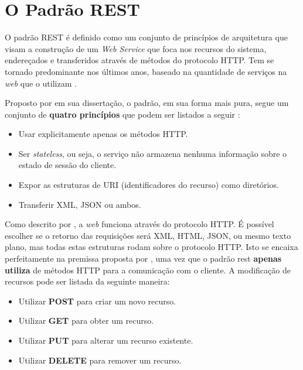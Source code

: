 \documentclass[12pt, openright, oneside, a4paper, brazil]{abntex2}
\begin{document}
\section{O Padrão REST}

O padrão REST é definido como um conjunto de princípios de arquitetura que visam a construção de um \textit{Web Service} que foca nos recursos do sistema, endereçados e transferidos através de métodos do protocolo HTTP. Tem se tornado predominante nos últimos anos, baseado na quantidade de serviços na \textit{web} que o utilizam \cite{rodriguez2008restful}.

Proposto por  em sua dissertação, o padrão, em sua forma mais pura, segue um conjunto de \textbf{quatro princípios} que podem ser listados a seguir \cite{rodriguez2008restful}:

\begin{itemize}
	\item Usar explicitamente apenas os métodos HTTP.

	\item Ser \textit{stateless}, ou seja, o serviço não armazena nenhuma informação sobre o estado de sessão do cliente.

	\item Expor as estruturas de URI (identificadores do recurso) como diretórios.

	\item Transferir XML, JSON ou ambos.
\end{itemize}

Como descrito por , a \textit{web} funciona através do protocolo HTTP. É possível escolher se o retorno das requisições será XML, HTML, JSON, ou mesmo texto plano, mas todas estas estruturas rodam sobre o protocolo HTTP. Isto se encaixa perfeitamente na premissa proposta por , uma vez que o padrão rest \textbf{apenas utiliza} de métodos HTTP para a comunicação com o cliente. A modificação de recursos pode ser listada da seguinte maneira:

\begin{itemize}
	\item Utilizar \textbf{POST} para criar um novo recurso.

	\item Utilizar \textbf{GET} para obter um recurso.

	\item Utilizar \textbf{PUT} para alterar um recurso existente.

	\item Utilizar \textbf{DELETE} para remover um recurso.
\end{itemize}
\end{document}
